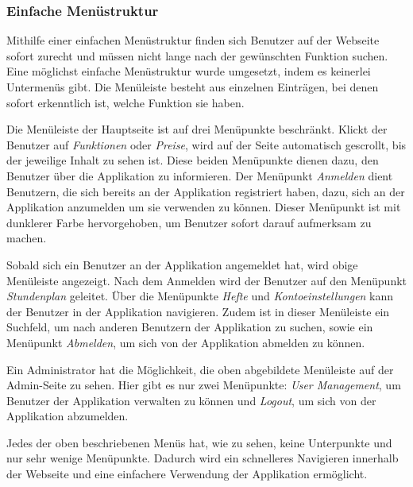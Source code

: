 \subsubsection{Einfache Menüstruktur}
Mithilfe einer einfachen Menüstruktur finden sich Benutzer auf der Webseite sofort zurecht und müssen nicht lange nach der gewünschten Funktion suchen. Eine möglichst einfache Menüstruktur wurde umgesetzt, indem es keinerlei Untermenüs gibt. Die Menüleiste besteht aus einzelnen Einträgen, bei denen sofort erkenntlich ist, welche Funktion sie haben.\\


Die Menüleiste der Hauptseite ist auf drei Menüpunkte beschränkt. Klickt der Benutzer auf \textit{Funktionen} oder \textit{Preise}, wird auf der Seite automatisch gescrollt, bis der jeweilige Inhalt zu sehen ist. Diese beiden Menüpunkte dienen dazu, den Benutzer über die Applikation zu informieren. Der Menüpunkt \textit{Anmelden} dient Benutzern, die sich bereits an der Applikation registriert haben, dazu, sich an der Applikation anzumelden um sie verwenden zu können. Dieser Menüpunkt ist mit dunklerer Farbe hervorgehoben, um Benutzer sofort darauf aufmerksam zu machen.


Sobald sich ein Benutzer an der Applikation angemeldet hat, wird obige Menüleiste angezeigt. Nach dem Anmelden wird der Benutzer auf den Menüpunkt \textit{Stundenplan} geleitet. Über die Menüpunkte \textit{Hefte} und \textit{Kontoeinstellungen} kann der Benutzer in der Applikation navigieren. Zudem ist in dieser Menüleiste ein Suchfeld, um nach anderen Benutzern der Applikation zu suchen, sowie ein Menüpunkt \textit{Abmelden}, um sich von der Applikation abmelden zu können.


Ein Administrator hat die Möglichkeit, die oben abgebildete Menüleiste auf der Admin-Seite zu sehen. Hier gibt es nur zwei Menüpunkte: \textit{User Management}, um Benutzer der Applikation verwalten zu können und \textit{Logout}, um sich von der Applikation abzumelden.

Jedes der oben beschriebenen Menüs hat, wie zu sehen, keine Unterpunkte und nur sehr wenige Menüpunkte. Dadurch wird ein schnelleres Navigieren innerhalb der Webseite und eine einfachere Verwendung der Applikation ermöglicht.

